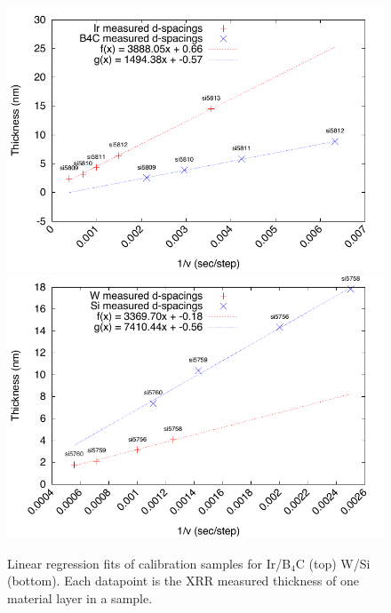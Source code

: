 \begin{figure}[!h]
	\center
\includegraphics[width=0.8\linewidth]{figures/chamber/calibration_plot-ir-b4c.pdf}
\includegraphics[width=0.8\linewidth]{figures/chamber/calibration_plot-w-si.pdf}
\caption{\footnotesize Linear regression fits of calibration samples for Ir/B$_4$C (top) W/Si (bottom). Each datapoint is the XRR measured thickness of one material layer in a sample.}\label{fig:calib-fit}
\end{figure}
